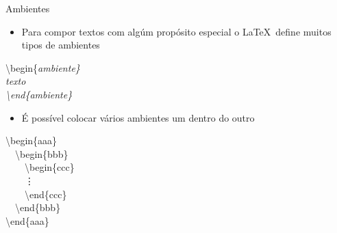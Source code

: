 \begin{frame}{Ambientes}
    \begin{itemize}
    \item Para compor textos com algúm propósito especial o \LaTeX\ define muitos tipos de ambientes
    \end{itemize}

    \alert{\textbackslash begin\{\it ambiente\} \\
           \textit{texto} \\
           \textbackslash end\{\it ambiente\}}

    \begin{itemize}
    \item É possível colocar vários ambientes um dentro do outro
    \end{itemize}

    \alert{\small
    \textbackslash begin\{aaa\} \\
    \ \ \textbackslash begin\{bbb\} \\
    \ \ \ \ \textbackslash begin\{ccc\} \\
    \ \ \ \ \vdots \\
    \ \ \ \ \textbackslash end\{ccc\} \\
    \ \ \textbackslash end\{bbb\} \\
    \textbackslash end\{aaa\}
    }
\end{frame}

